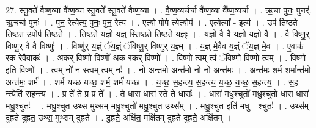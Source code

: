 \documentclass[17pt]{extarticle}
\begin{document}
27. स्तु॒वते॑ वैष्ण॒व्या वै᳚ष्ण॒व्या स्तु॒वते᳚ स्तु॒वते॑ वैष्ण॒व्या । . वै॒ष्ण॒व्यर्चर्चा वै᳚ष्ण॒व्या वै᳚ष्ण॒व्यर्चा । . ऋ॒चा पुनः॒ पुनर्॑. ऋ॒चर्चा पुनः॑ । . पुन॒ रेत्येत्य॒ पुनः॒ पुन॒ रेत्य॑ । . एत्यो पोपे त्येत्योप॑ । . एत्येत्या᳚ - इत्य॑ । . उप॑ तिष्ठते तिष्ठत॒ उपोप॑ तिष्ठते । . ति॒ष्ठ॒ते॒ य॒ज्ञो य॒ज्ञ् स्ति॑ष्ठते तिष्ठते य॒ज्ञ्ः । . य॒ज्ञो वै वै य॒ज्ञो य॒ज्ञो वै । . वै विष्णु॒र् विष्णु॒र् वै वै विष्णुः॑ । . विष्णु॑र् य॒ज्ञ्ं ॅय॒ज्ञ्ं ॅविष्णु॒र् विष्णु॑र् य॒ज्ञ्म् । . य॒ज्ञ् मे॒वैव य॒ज्ञ्ं ॅय॒ज्ञ् मे॒व । . ए॒वाक॑ रक रे॒वैवाकः॑ । . अ॒क॒र् विष्णो॒ विष्णो॑ अक रक॒र् विष्णो᳚ । . विष्णो॒ त्वम् त्वं ॅविष्णो॒ विष्णो॒ त्वम् । . विष्णो॒ इति॒ विष्णो᳚ । . त्वम् नो॑ न॒ स्त्वम् त्वम् नः॑ । . नो॒ अन्त॑मो॒ अन्त॑मो नो नो॒ अन्त॑मः । . अन्त॑मः॒ शर्म॒ शर्मान्त॑मो॒ अन्त॑मः॒ शर्म॑ । . शर्म॑ यच्छ यच्छ॒ शर्म॒ शर्म॑ यच्छ । . य॒च्छ॒ स॒ह॒न्त्य॒ स॒ह॒न्त्य॒ य॒च्छ॒ य॒च्छ॒ स॒ह॒न्त्य॒ । . स॒ह॒ न्त्येति॑ सहन्त्य । . प्र ते॑ ते॒ प्र प्र ते᳚ । . ते॒ धारा॒ धारा᳚ स्ते ते॒ धाराः᳚ । . धारा॑ मधु॒श्चुतो॑ मधु॒श्चुतो॒ धारा॒ धारा॑ मधु॒श्चुतः॑ । . म॒धु॒श्चुत॒ उथ्स॒ मुथ्स॑म् मधु॒श्चुतो॑ मधु॒श्चुत॒ उथ्स᳚म् । . म॒धु॒श्चुत॒ इति॑ मधु - श्चुतः॑ । . उथ्स॑म् दुह्रते दुह्रत॒ उथ्स॒ मुथ्स॑म् दुह्रते । . दु॒ह्र॒ते॒ अक्षि॑त॒ मक्षि॑तम् दुह्रते दुह्रते॒ अक्षि॑तम् । \newline
\end{document}
